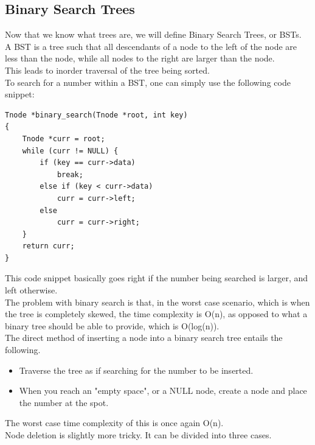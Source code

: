 \documentclass[nobib]{tufte-handout}
\begin{document}
\subsection{Binary Search Trees}
Now that we know what trees are, we will define Binary Search Trees, or BSTs.\\
A BST is a tree such that all descendants of a node to the left of the node are
less than the node, while all nodes to the right are larger than the node.\\
This leads to inorder traversal of the tree being sorted.\\ To search for a
number within a BST, one can simply use the following code snippet:
\begin{lstlisting}
Tnode *binary_search(Tnode *root, int key)
{
    Tnode *curr = root;
    while (curr != NULL) {
        if (key == curr->data)
            break;
        else if (key < curr->data)
            curr = curr->left;
        else
            curr = curr->right;
    }
    return curr;
}
\end{lstlisting}
This code snippet basically goes right if the number being searched is larger,
and left otherwise.\\ The problem with binary search is that, in the worst case
scenario, which is when the tree is completely skewed, the time complexity is
O(n), as opposed to what a binary tree should be able to provide, which is
O(log(n)).\\ The direct method of inserting a node into a binary search tree
entails the following.
\begin{itemize}
    \item Traverse the tree as if searching for the number to be inserted.
    \item When you reach an "empty space", or a NULL node, create a node and place the
          number at the spot.
\end{itemize}
The worst case time complexity of this is once again O(n).\\
Node deletion is slightly more tricky. It can be divided into three cases.
\end{document}
